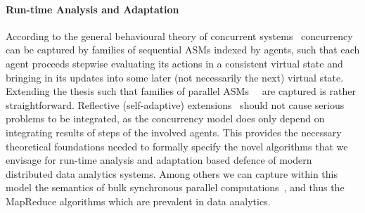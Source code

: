 \documentclass[a4paper,11pt]{article}
\begin{document}


\paragraph{Run-time Analysis and Adaptation}
According to the general behavioural theory of concurrent systems~\cite{BorgerS16} concurrency can be captured by families of sequential ASMs indexed by agents, such that each agent proceeds stepwise evaluating its actions in a consistent virtual state and bringing in its updates into some later (not necessarily the next) virtual state. Extending the thesis such that families of parallel ASMs~\cite{FerrarottiSTW16}  are captured is rather straightforward. Reflective (self-adaptive) extensions~\cite{abs-2001-01873} should not cause serious problems to be integrated, as the concurrency model does only depend on integrating results of steps of the involved agents. This provides the necessary theoretical foundations  needed to formally specify the novel algorithms that we envisage for run-time analysis and adaptation based defence of modern distributed data analytics systems. Among others we can capture within this model the semantics of bulk synchronous parallel computations~\cite{FerrarottiGS19}, and thus the MapReduce algorithms which are prevalent in data analytics. 
%
\end{document}
